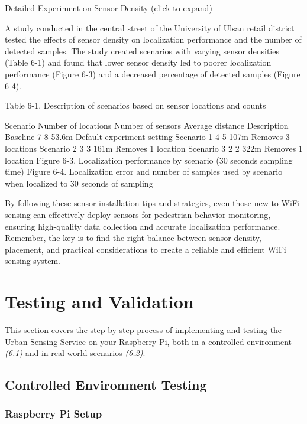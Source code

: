 \documentclass[
  letterpaper,
]{scrbook}
\begin{document}
Detailed Experiment on Sensor Density (click to expand)

A study conducted in the central street of the University of Ulsan
retail district tested the effects of sensor density on localization
performance and the number of detected samples. The study created
scenarios with varying sensor densities (Table 6-1) and found that lower
sensor density led to poorer localization performance (Figure 6-3) and a
decreased percentage of detected samples (Figure 6-4).

Table 6-1. Description of scenarios based on sensor locations and counts

Scenario Number of locations Number of sensors Average distance
Description Baseline 7 8 53.6m Default experiment setting Scenario 1 4 5
107m Removes 3 locations Scenario 2 3 3 161m Removes 1 location Scenario
3 2 2 322m Removes 1 location Figure 6-3. Localization performance by
scenario (30 seconds sampling time) Figure 6-4. Localization error and
number of samples used by scenario when localized to 30 seconds of
sampling

By following these sensor installation tips and strategies, even those
new to WiFi sensing can effectively deploy sensors for pedestrian
behavior monitoring, ensuring high-quality data collection and accurate
localization performance. Remember, the key is to find the right balance
between sensor density, placement, and practical considerations to
create a reliable and efficient WiFi sensing system.

\hypertarget{testing-and-validation}{%
\chapter{Testing and Validation}\label{testing-and-validation}}

This section covers the step-by-step process of implementing and testing
the Urban Sensing Service on your Raspberry Pi, both in a controlled
environment \emph{(6.1)} and in real-world scenarios \emph{(6.2)}.

\hypertarget{controlled-environment-testing}{%
\section{Controlled Environment
Testing}\label{controlled-environment-testing}}

\hypertarget{raspberry-pi-setup-1}{%
\subsection{Raspberry Pi Setup}\label{raspberry-pi-setup-1}}
\end{document}

